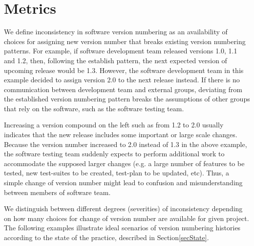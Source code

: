 \documentclass[conference]{IEEEtran}
\begin{document}
\section{Metrics}

We define inconsistency in software version numbering as an availability of choices for assigning new version number that breaks existing version numbering patterns. 
For example, if software development team released versions 1.0, 1.1 and 1.2, then, following the establish pattern, the next expected version of upcoming release would be 1.3. 
However,  the software development team in this example decided to assign version 2.0 to the next release instead.
If there is no communication between development team and external groups, deviating from the established version numbering pattern breaks the assumptions of other groups that rely on the software, such as the software testing team.

Increasing a version compound on the left such as from 1.2 to 2.0 usually indicates that the new release includes some important or large scale changes. Because the version number increased to 2.0 instead of 1.3 in the above example,  the software testing team suddenly expects to perform additional work to accommodate the supposed larger changes (e.g. a large number of features to be tested, new test-suites to be created, test-plan to be updated, etc).
Thus, a simple change of version number might lead to confusion and misunderstanding between members of software team.


We distinguish between different degrees (severities) of inconsistency depending on how many choices for change of version number are available for given project. The following examples illustrate ideal scenarios of version numbering histories according to the state of the practice, described in Section\ref{secState}.\\
\end{document}
